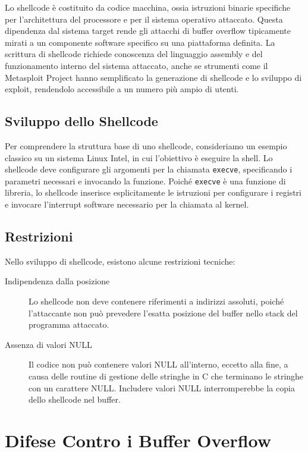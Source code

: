 Lo shellcode è costituito da codice macchina, ossia istruzioni binarie specifiche per l'architettura del processore e per il sistema operativo attaccato. Questa dipendenza dal sistema target rende gli attacchi di buffer overflow tipicamente mirati a un componente software specifico su una piattaforma definita. La scrittura di shellcode richiede conoscenza del linguaggio assembly e del funzionamento interno del sistema attaccato, anche se strumenti come il Metasploit Project hanno semplificato la generazione di shellcode e lo sviluppo di exploit, rendendolo accessibile a un numero più ampio di utenti.

\subsection{Sviluppo dello Shellcode}

Per comprendere la struttura base di uno shellcode, consideriamo un esempio classico su un sistema Linux Intel, in cui l'obiettivo è eseguire la shell. Lo shellcode deve configurare gli argomenti per la chiamata \texttt{execve}, specificando i parametri necessari e invocando la funzione. Poiché \texttt{execve} è una funzione di libreria, lo shellcode inserisce esplicitamente le istruzioni per configurare i registri e invocare l'interrupt software necessario per la chiamata al kernel.

\subsection{Restrizioni}

Nello sviluppo di shellcode, esistono alcune restrizioni tecniche:

\begin{description}
    \item[Indipendenza dalla posizione] Lo shellcode non deve contenere riferimenti a indirizzi assoluti, poiché l'attaccante non può prevedere l'esatta posizione del buffer nello stack del programma attaccato.
    
    \item[Assenza di valori NULL] Il codice non può contenere valori NULL all'interno, eccetto alla fine, a causa delle routine di gestione delle stringhe in C che terminano le stringhe con un carattere NULL. Includere valori NULL interromperebbe la copia dello shellcode nel buffer.
\end{description}

\section{Difese Contro i Buffer Overflow}

